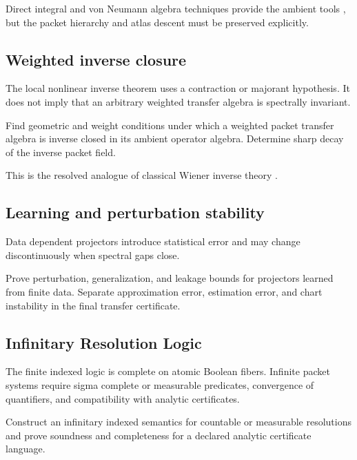 \documentclass{aomart}
\theoremstyle{definition}
\theoremstyle{remark}
\newcommand{\Rcite}[1]{\cite{#1}}
\begin{document}
Direct integral and von Neumann algebra techniques provide the ambient tools \Rcite{R8}, but the packet hierarchy and atlas descent must be preserved explicitly.

\subsection{Weighted inverse closure}

The local nonlinear inverse theorem uses a contraction or majorant hypothesis. It does not imply that an arbitrary weighted transfer algebra is spectrally invariant.

\begin{problem}\label{prob:wiener}
Find geometric and weight conditions under which a weighted packet transfer algebra is inverse closed in its ambient operator algebra. Determine sharp decay of the inverse packet field.
\end{problem}

This is the resolved analogue of classical Wiener inverse theory \Rcite{R18}.

\subsection{Learning and perturbation stability}

Data dependent projectors introduce statistical error and may change discontinuously when spectral gaps close.

\begin{problem}\label{prob:learning}
Prove perturbation, generalization, and leakage bounds for projectors learned from finite data. Separate approximation error, estimation error, and chart instability in the final transfer certificate.
\end{problem}

\subsection{Infinitary Resolution Logic}

The finite indexed logic is complete on atomic Boolean fibers. Infinite packet systems require sigma complete or measurable predicates, convergence of quantifiers, and compatibility with analytic certificates.

\begin{problem}\label{prob:infinite_logic}
Construct an infinitary indexed semantics for countable or measurable resolutions and prove soundness and completeness for a declared analytic certificate language.
\end{problem}
\end{document}
